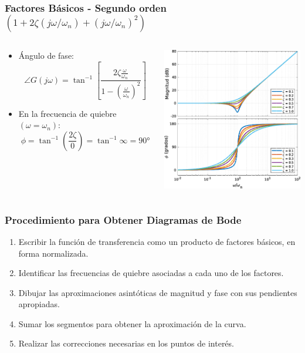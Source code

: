 \documentclass[aspectratio=169, handout]{beamer}
\theoremstyle{definition}
\theoremstyle{plain}
\theoremstyle{remark}
\begin{document}
\begin{frame}[<+->]\frametitle{Factores Básicos - Segundo orden $(1+2\zeta(j\omega/\omega_n)+(j\omega/\omega_n)^2)$}
\vspace*{7mm}
\begin{columns}
	\begin{column}{0.5\textwidth}
	\begin{itemize}
		\item Ángulo de fase:
		\begin{equation*}
			\angle G(j\omega) = \tan^{-1} \left[\frac{2\zeta\frac{\omega}{\omega_n}}{1-\left(\frac{\omega}{\omega_n}\right)^2} \right]
		\end{equation*}
		\item En la frecuencia de quiebre $(\omega = \omega_n)$:
		\begin{equation*}
			\phi = \tan^{-1}\left(\frac{2\zeta}{0}\right) = \tan^{-1}\infty = \ang{90}
		\end{equation*}
	\end{itemize}
	\end{column}
	\begin{column}{0.5\textwidth}
	\centering
	\includegraphics[width=6.5cm]{images/bodeSecondOrderDerivative.eps}
	\end{column}
\end{columns}
\end{frame}

\begin{frame}[<+->]\frametitle{Procedimiento para Obtener Diagramas de Bode}
	\begin{enumerate}
		\item Escribir la función de transferencia como un producto de factores básicos, en forma normalizada.
		\item Identificar las frecuencias de quiebre asociadas a cada uno de los factores.
		\item Dibujar las aproximaciones asintóticas de magnitud y fase con sus pendientes apropiadas.
		\item Sumar los segmentos para obtener la aproximación de la curva.
		\item Realizar las correcciones necesarias en los puntos de interés.
	\end{enumerate}
\end{frame}
\end{document}

